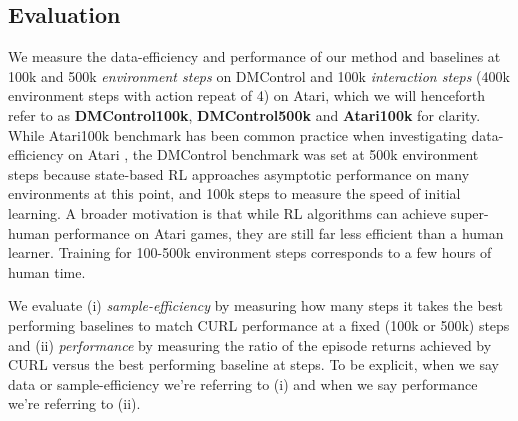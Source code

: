 \documentclass{article}
\begin{document}
\subsection{Evaluation}

We measure the data-efficiency and performance of our method and baselines at 100k and 500k \textit{environment steps} on DMControl and 100k \textit{interaction steps} (400k environment steps with action repeat of 4) on Atari, which we will henceforth refer to as \textbf{DMControl100k}, \textbf{DMControl500k} and \textbf{Atari100k} for clarity. While Atari100k benchmark has been common practice when  investigating data-efficiency on Atari  \cite{kaiser2019model, van2019use, kielak2020rainbow}, the DMControl benchmark was set at 500k environment steps because state-based RL approaches asymptotic performance on many environments at this point, and 100k steps to measure the speed of initial learning. A broader motivation is that while RL algorithms can achieve super-human performance on Atari games, they are still far less efficient than a human learner. Training for 100-500k environment steps corresponds to a few hours of human time. 

We evaluate (i) \textit{sample-efficiency} by measuring how many steps it takes the best performing baselines to match CURL performance at a fixed  (100k or 500k) steps and (ii) \textit{performance} by measuring the ratio of the episode returns achieved by CURL versus the best performing baseline at  steps. To be explicit, when we say data or sample-efficiency we're referring to (i) and when we say performance we're referring to (ii).
\end{document}
